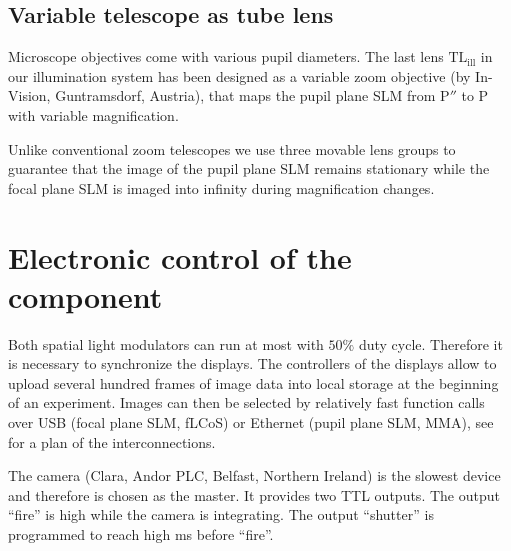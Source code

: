  	
	  	

\subsection{ Variable telescope as tube lens}
Microscope objectives come with various pupil diameters. The last lens
$\textrm{TL}_\textrm{ill}$ in our illumination system has been
designed as a variable zoom objective (by In-Vision, Guntramsdorf,
Austria), that maps the pupil plane SLM from $\textrm{P}''$ to
$\textrm{P}$ with variable magnification.

Unlike conventional zoom telescopes we use three movable lens groups
to guarantee that the image of the pupil plane SLM remains stationary
while the focal plane SLM is imaged into infinity during magnification
changes.



\section{Electronic control of the component}
Both spatial light modulators can run at most with $50\%$ duty
 cycle. Therefore it is necessary to
synchronize the displays. The controllers of the displays allow to
upload several hundred frames of image data into local storage at the
beginning of an experiment. Images can then be selected by relatively
fast function calls over USB (focal plane SLM, fLCoS) or Ethernet
(pupil plane SLM, MMA), see  for a plan
of the interconnections.

The camera (Clara, Andor PLC, Belfast, Northern Ireland) is the
 slowest device and therefore is chosen as the
master. It provides two TTL outputs. The output ``fire'' is high while
the camera is integrating. The output ``shutter'' is programmed to reach
high \unit[1]{ms} before ``fire''.

